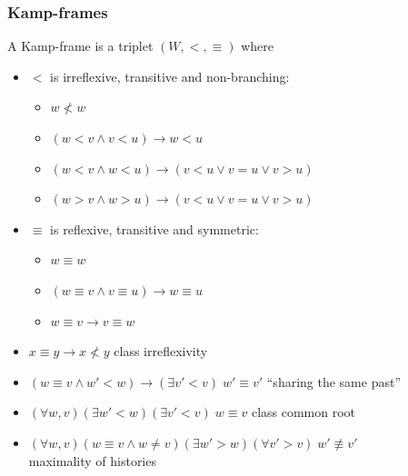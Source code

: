 \documentclass[xcolor=x11names]{beamer}
\newcommand{\lthen}{\rightarrow}
\newcommand{\forallp}[1]{(\forall #1)}
\newcommand{\existsp}[1]{(\exists #1)}
\begin{document}

\begin{frame}
	\frametitle{Kamp-frames}

A Kamp-frame is a triplet $(W, <, \equiv)$ where
\begin{itemize}
\item $<$ is irreflexive, transitive and non-branching:
\begin{itemize}
\item $w\not < w$
\item $(w<v \land v<u )\lthen w<u$
\item $(w<v \land w<u) \lthen (v<u\lor v=u\lor v>u)$
\item $(w>v \land w>u) \lthen (v<u\lor v=u\lor v>u)$
\end{itemize}
\item $\equiv$ is reflexive, transitive and symmetric:
\begin{itemize}
\item $w\equiv w$
\item $(w\equiv v \land v\equiv u )\lthen w\equiv u$
\item $w\equiv v \lthen v\equiv w$
\end{itemize}
\item $x \equiv y \lthen x\not <y$ \hfill class irreflexivity
\item $(w \equiv v \land w'<w ) \lthen \existsp {v'<v} \;w'\equiv v'$  \hfill  ``sharing the same past''
\item $\forallp{w,v}\existsp{w'<w}\existsp {v'<v} \;w\equiv v$ \hfill class common root
\item $\forallp{w,v} (w \equiv v \land w\neq v) \existsp{w'>w}\forallp {v'>v} \;w'\not\equiv v'$ \\ \hfill maximality of histories
\end{itemize}


\end{frame}
\end{document}
